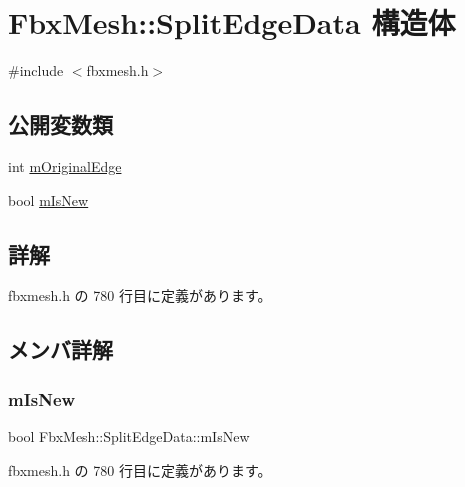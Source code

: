 \hypertarget{struct_fbx_mesh_1_1_split_edge_data}{}\section{Fbx\+Mesh\+:\+:Split\+Edge\+Data 構造体}
\label{struct_fbx_mesh_1_1_split_edge_data}


{\ttfamily \#include $<$fbxmesh.\+h$>$}

\subsection*{公開変数類}
\begin{DoxyCompactItemize}
\item 
int \hyperlink{struct_fbx_mesh_1_1_split_edge_data_a044ee1598a1592278260a1487a0ee698}{m\+Original\+Edge}
\item 
bool \hyperlink{struct_fbx_mesh_1_1_split_edge_data_a98ff97a953aa2eb1010771b2f5e79477}{m\+Is\+New}
\end{DoxyCompactItemize}


\subsection{詳解}


 fbxmesh.\+h の 780 行目に定義があります。



\subsection{メンバ詳解}
\mbox{\label{struct_fbx_mesh_1_1_split_edge_data_a98ff97a953aa2eb1010771b2f5e79477}} 
\subsubsection{\texorpdfstring{m\+Is\+New}{mIsNew}}
{\footnotesize\ttfamily bool Fbx\+Mesh\+::\+Split\+Edge\+Data\+::m\+Is\+New}



 fbxmesh.\+h の 780 行目に定義があります。

\mbox{\label{struct_fbx_mesh_1_1_split_edge_data_a044ee1598a1592278260a1487a0ee698}} 
